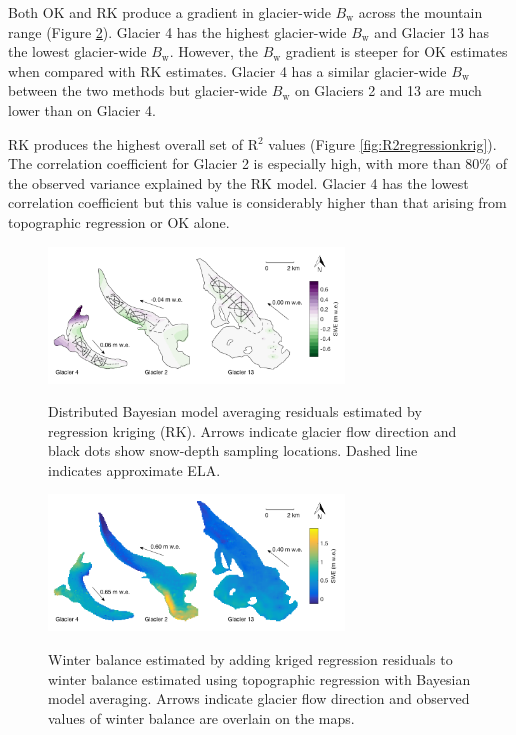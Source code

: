 \documentclass[onecolumn, letterpaper]{igs}
\newcommand{\topomap}{Arrows indicate glacier flow direction and black dots show snow-depth sampling locations. }
\newcommand{\swedots}{Arrows indicate glacier flow direction and observed values of winter balance are overlain on the maps. }
\begin{document}
Both OK and RK produce a gradient in glacier-wide $B_\mathrm{w}$ across the mountain range (Figure \ref{fig:Regression-Kriging}). Glacier 4 has the highest glacier-wide $B_\mathrm{w}$ and Glacier 13 has the lowest glacier-wide $B_\mathrm{w}$. However, the $B_\mathrm{w}$ gradient is steeper for OK estimates when compared with RK estimates. Glacier 4 has a similar glacier-wide $B_\mathrm{w}$ between the two methods but glacier-wide $B_\mathrm{w}$ on Glaciers 2 and 13 are much lower than on Glacier 4.  

RK produces the highest overall set of R$^2$ values (Figure \ref{fig:R2regressionkrig}). The correlation coefficient for Glacier 2 is especially high, with more than 80\% of the observed variance explained by the RK model. Glacier 4 has the lowest correlation coefficient but this value is considerably higher than that arising from topographic regression or OK alone. 

\begin{figure}
	\centering
	\includegraphics[width = 0.7\textwidth]{residualsKriged.png}\\
	\caption[Distributed Bayesian model averaging residuals estimated by regression kriging (RK)]{Distributed Bayesian model averaging residuals estimated by regression kriging (RK). \topomap Dashed line indicates approximate ELA.}
	\label{fig:residualsKRIGING}
\end{figure}

\begin{figure}
	\centering
	\includegraphics[width = 0.7\textwidth]{RegressionKriging.png}\\
	\caption[Winter balance estimated by adding kriged regression residuals to winter balance estimated using topographic regression with Bayesian model averaging]{Winter balance estimated by adding kriged regression residuals to winter balance estimated using topographic regression with Bayesian model averaging. \swedots}
	\label{fig:Regression-Kriging}
\end{figure}
\end{document}
